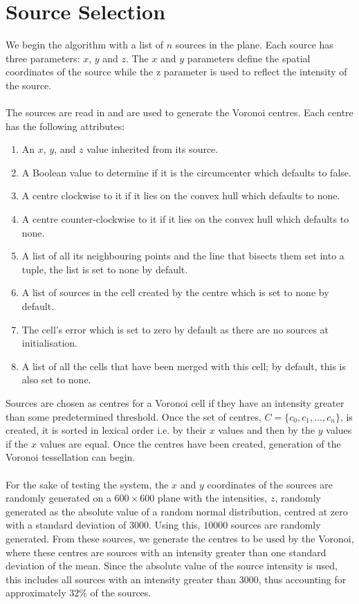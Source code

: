 \section{Source Selection}\label{sec:design:source}
We begin the algorithm with a list of $n$ sources in the plane. Each source has three parameters: $x$, $y$ and $z$. The $x$ and $y$ parameters define the spatial coordinates of the source while the z parameter is used to reflect the intensity of the source.
\\
\\
The sources are read in and are used to generate the Voronoi centres. Each centre has the following attributes:
\begin{enumerate}
\item An $x$, $y$, and $z$ value inherited from its source.
\item A Boolean value to determine if it is the circumcenter which defaults to false.
\item A centre clockwise to it if it lies on the convex hull which defaults to none.
\item A centre counter-clockwise to it if it lies on the convex hull which defaults to none.
\item A list of all its neighbouring points and the line that bisects them set into a tuple, the list is set to none by default.
\item A list of sources in the cell created by the centre which is set to none by default.
\item The cell's error which is set to zero by default as there are no sources at initialisation.
\item A list of all the cells that have been merged with this cell; by default, this is also set to none.
\end{enumerate} 
Sources are chosen as centres for a Voronoi cell if they have an intensity greater than some predetermined threshold. Once the set of centres, $C= \{c_0,c_1,...,c_n\}$, is created, it is sorted in lexical order i.e. by their $x$ values and then by the $y$ values if the $x$ values are equal. Once the centres have been created, generation of the Voronoi tessellation can begin.
\\
\\
For the sake of testing the system, the $x$ and $y$ coordinates of the sources are randomly generated on a $600 \times 600$ plane with the intensities, $z$, randomly generated as the absolute value of a random normal distribution, centred at zero with a standard deviation of $3000$. Using this, $10000$ sources are randomly generated. From these sources, we generate the centres to be used by the Voronoi, where these centres are sources with an intensity greater than one standard deviation of the mean. Since the absolute value of the source intensity is used, this includes all sources with an intensity greater than 3000, thus accounting for approximately $32\%$ of the sources.
